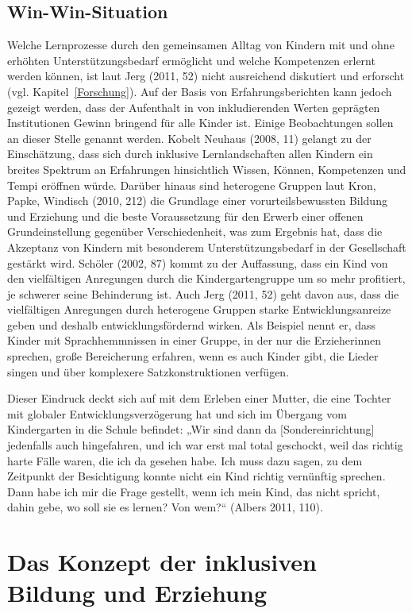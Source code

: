 \subsection{Win-Win-Situation}
Welche Lernprozesse durch den gemeinsamen Alltag von Kindern mit und ohne erhöhten Unterstützungsbedarf ermöglicht und welche Kompetenzen erlernt werden können, ist laut Jerg (2011, 52) nicht ausreichend diskutiert und erforscht (vgl. Kapitel~\ref{Forschung}).
Auf der Basis von Erfahrungsberichten kann jedoch gezeigt werden, dass der Aufenthalt in von inkludierenden Werten geprägten Institutionen Gewinn bringend für alle Kinder ist. Einige Beobachtungen sollen an dieser Stelle genannt werden. 
Kobelt Neuhaus (2008, 11) gelangt zu der Einschätzung, dass sich durch inklusive Lernlandschaften allen Kindern ein breites Spektrum an Erfahrungen hinsichtlich Wissen, Können, Kompetenzen und Tempi eröffnen würde. 
Darüber hinaus sind heterogene Gruppen laut Kron, Papke, Windisch (2010, 212) die Grundlage einer vorurteilsbewussten Bildung und Erziehung und die beste Voraussetzung für den Erwerb einer offenen Grundeinstellung gegenüber Verschiedenheit, was zum Ergebnis hat, dass die Akzeptanz von Kindern mit besonderem Unterstützungsbedarf in der Gesellschaft gestärkt wird.  
Schöler (2002, 87) kommt zu der Auffassung, dass ein Kind von den vielfältigen Anregungen durch die Kindergartengruppe um so mehr profitiert, je schwerer seine Behinderung ist. 
Auch Jerg (2011, 52) geht davon aus, dass die vielfältigen Anregungen durch heterogene Gruppen starke Entwicklungsanreize geben und deshalb entwicklungsfördernd wirken. Als Beispiel nennt er, dass Kinder mit Sprachhemmnissen in einer Gruppe, in der nur die Erzieherinnen sprechen, große Bereicherung erfahren, wenn es auch Kinder gibt, die Lieder singen und über komplexere Satzkonstruktionen verfügen.

Dieser Eindruck deckt sich auf mit dem Erleben einer Mutter, die eine Tochter mit globaler Entwicklungsverzögerung hat und sich im Übergang vom Kindergarten in die Schule befindet: 
„Wir sind dann da [Sondereinrichtung] jedenfalls auch hingefahren, und ich war erst mal total geschockt, weil das richtig harte Fälle waren, die ich da gesehen habe. Ich muss dazu sagen, zu dem Zeitpunkt der Besichtigung konnte nicht ein Kind richtig vernünftig sprechen. Dann habe ich mir die Frage gestellt, wenn ich mein Kind, das nicht spricht, dahin gebe, wo soll sie es lernen? Von wem?“ (Albers 2011, 110).

\section{Das Konzept der inklusiven Bildung und Erziehung}\label{sec:Inklusionsverstandnis}

